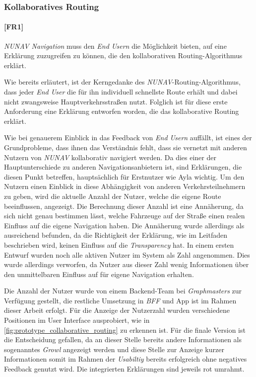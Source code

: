 \subsubsection{Kollaboratives Routing}

\paragraph{[FR1]} \textit{NUNAV Navigation} muss den \textit{End Usern} die Möglichkeit bieten, auf eine Erklärung zuzugreifen zu können, die den kollaborativen Routing-Algorithmus erklärt.

\bigskip

Wie bereits erläutert, ist der Kerngedanke des \textit{NUNAV}-Routing-Algorithmus, dass jeder \textit{End User} die für ihn individuell schnellste Route erhält und dabei nicht zwangsweise Hauptverkehrsstraßen nutzt. Folglich ist für diese erste Anforderung eine Erklärung entworfen worden, die das kollaborative Routing erklärt.

Wie bei genauerem Einblick in das Feedback von \textit{End Usern} auffällt, ist eines der Grundprobleme, dass ihnen das Verständnis fehlt, dass sie vernetzt mit anderen Nutzern von \textit{NUNAV} kollaborativ navigiert werden. Da dies einer der Hauptunterschiede zu anderen Navigationsanbietern ist, sind Erklärungen, die diesen Punkt betreffen, hauptsächlich für Erstnutzer wie Ayla wichtig. Um den Nutzern einen Einblick in diese Abhängigkeit von anderen Verkehrsteilnehmern zu geben, wird die aktuelle Anzahl der Nutzer, welche die eigene Route beeinflussen, angezeigt. Die Berechnung dieser Anzahl ist eine Annäherung, da sich nicht genau bestimmen lässt, welche Fahrzeuge auf der Straße einen realen Einfluss auf die eigene Navigation haben. Die Annäherung wurde allerdings als ausreichend befunden, da die Richtigkeit der Erklärung, wie im Leitfaden beschrieben wird, keinen Einfluss auf die \textit{Transparency} hat. In einem ersten Entwurf wurden noch alle aktiven Nutzer im System als Zahl angenommen. Dies wurde allerdings verworfen, da Nutzer aus dieser Zahl wenig Informationen über den unmittelbaren Einfluss auf für eigene Navigation erhalten.

Die Anzahl der Nutzer wurde von einem Backend-Team bei \textit{Graphmasters} zur Verfügung gestellt, die restliche Umsetzung in \textit{BFF} und App ist im Rahmen dieser Arbeit erfolgt. Für die Anzeige der Nutzerzahl wurden verschiedene Positionen im User Interface ausprobiert, wie in \autoref{fig:prototype_collaborative_routing} zu erkennen ist. Für die finale Version ist die Entscheidung gefallen, da an dieser Stelle bereits andere Informationen als sogenanntes \textit{Growl} angezeigt werden und diese Stelle zur Anzeige kurzer Informationen somit im Rahmen der \textit{Usabiltiy} bereits erfolgreich ohne negatives Feedback genutzt wird. Die integrierten Erklärungen sind jeweils rot umrahmt.

